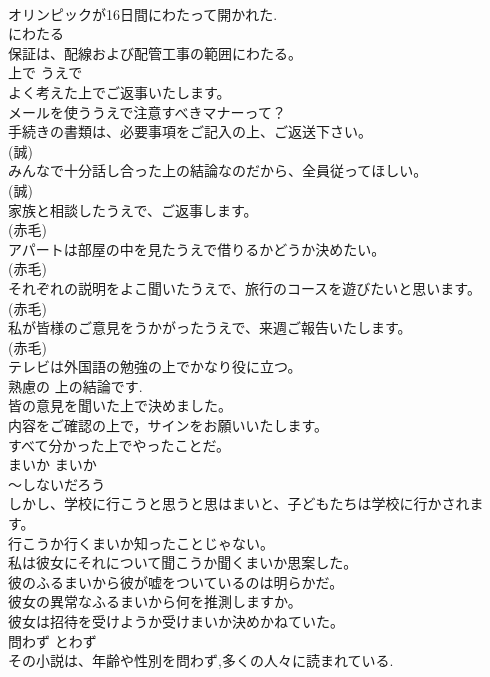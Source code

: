 \documentclass[8pt]{extreport}
\begin{document}
\begin{CJK}{UTF8}{min}
\\	オリンピックが16日間にわたって開かれた.	
\\	にわたる  
\\	保証は、配線および配管工事の範囲にわたる。 
\\	上で	うえで	
\\	よく考えた上でご返事いたします。  
\\	メールを使ううえで注意すべきマナーって？  
\\	手続きの書類は、必要事項をご記入の上、ご返送下さい。  
\\	(誠)
\\	みんなで十分話し合った上の結論なのだから、全員従ってほしい。  
\\	(誠)
\\	家族と相談したうえで、ご返事します。  
\\	(赤毛)
\\	アパートは部屋の中を見たうえで借りるかどうか決めたい。  
\\	(赤毛)
\\	それぞれの説明をよこ聞いたうえで、旅行のコースを遊びたいと思います。  
\\	(赤毛)
\\	私が皆様のご意見をうかがったうえで、来週ご報告いたします。  
\\	(赤毛)
\\	テレビは外国語の勉強の上でかなり役に立つ。  
\\	熟慮の 上の結論です.  
\\	皆の意見を聞いた上で決めました。  
\\	内容をご確認の上で，サインをお願いいたします。  
\\	すべて分かった上でやったことだ。   
\\	まいか	まいか	
\\	〜しないだろう	
\\	しかし、学校に行こうと思うと思はまいと、子どもたちは学校に行かされます。  
\\	行こうか行くまいか知ったことじゃない。  
\\	私は彼女にそれについて聞こうか聞くまいか思案した。  
\\	彼のふるまいから彼が嘘をついているのは明らかだ。   
\\	彼女の異常なふるまいから何を推測しますか。   
\\	彼女は招待を受けようか受けまいか決めかねていた。   
\\	問わず	とわず	
\\	その小説は、年齢や性別を問わず,多くの人々に読まれている.  

\end{CJK}
\end{document}
